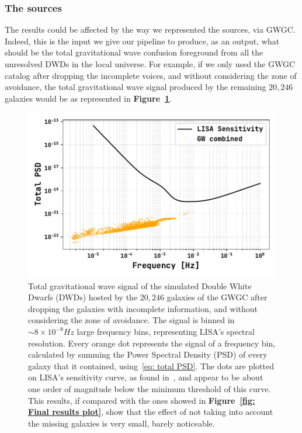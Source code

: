 \subsubsection{The sources}
The results could be affected by the way we represented the sources, via GWGC.
Indeed, this is the input we give our pipeline to produce, as an output, what should be the total gravitational wave confusion foreground from all the unresolved DWDs in the local universe.
For example, if we only used the GWGC catalog after dropping the incomplete voices, and without considering the zone of avoidance, the total gravitational wave signal produced by the remaining $20,246$ galaxies would be as represented in \textbf{Figure~\ref{fig: total signal plot with incomplete catalog}}.
\begin{figure}
    \begin{center}
        \includegraphics[width=\textwidth]{images/Final_results__incomplete_GWGC_plot.pdf}
    \end{center}
    \caption{Total gravitational wave signal of the simulated Double White Dwarfs (DWDs) hosted by the $20,246$ galaxies of the GWGC after dropping the galaxies with incomplete information, and without considering the zone of avoidance. 
    The signal is binned in $\sim 8\times10^{-9}Hz$ large frequency bins, representing LISA's spectral resolution. 
    Every orange dot represents the signal of a frequency bin, calculated by summing the Power Spectral Density (PSD) of every galaxy that it contained, using~\eqref{eq: total PSD}. 
    The dots are plotted on LISA's sensitivity curve, as found in~\cite{Robson_2019}, and appear to be about one order of magnitude below the minimum threshold of this curve.
    This results, if compared with the ones showed in \textbf{Figure~\ref{fig: Final results plot}}, show that the effect of not taking into account the missing galaxies is very small, barely noticeable. 
    }\label{fig: total signal plot with incomplete catalog}
\end{figure}
